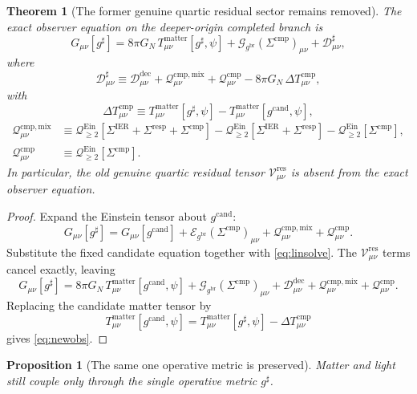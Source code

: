 \documentclass[11pt]{article}
\newcommand{\ObserverMetric}{g^{\mathrm{br}}}
\newcommand{\CandidateMetric}{g^{\mathrm{cand}}}
\newcommand{\CompletedMetric}{g^{\sharp}}
\newcommand{\BaseShift}{\Sigma^{\mathrm{IER}}}
\newcommand{\ResponseShift}{\Sigma^{\mathrm{resp}}}
\newcommand{\CompShift}{\Sigma^{\mathrm{cmp}}}
\newcommand{\ResidualCore}{\mathcal V_{\mu\nu}^{\mathrm{res}}}
\newcommand{\ResidualDec}{\mathcal D_{\mu\nu}^{\mathrm{dec}}}
\newcommand{\GaugeBook}{\mathcal G_{\ObserverMetric}}
\newcommand{\EinLin}{\mathcal E_{\ObserverMetric}}
\newcommand{\EinQuad}{\mathcal Q_{\ge 2}^{\mathrm{Ein}}}
\newcommand{\CompMix}{\mathcal Q_{\mu\nu}^{\mathrm{cmp,mix}}}
\newcommand{\CompQuad}{\mathcal Q_{\mu\nu}^{\mathrm{cmp}}}
\newcommand{\CompDec}{\mathcal D_{\mu\nu}^{\sharp}}
\newcommand{\DeltaTComp}{\Delta T_{\mu\nu}^{\mathrm{cmp}}}
\newtheorem{proposition}{Proposition}
\newtheorem{theorem}{Theorem}
\begin{document}
\begin{theorem}[The former genuine quartic residual sector remains removed]
\label{thm:removed}
The exact observer equation on the deeper-origin completed branch is
\begin{equation}
G_{\mu\nu}[\CompletedMetric]
=
8\pi G_N\,T_{\mu\nu}^{\mathrm{matter}}[\CompletedMetric,\psi]
+\GaugeBook(\CompShift)_{\mu\nu}
+\CompDec,
\label{eq:newobs}
\end{equation}
where
\begin{equation}
\CompDec
\equiv
\ResidualDec+\CompMix+\CompQuad-8\pi G_N\,\DeltaTComp,
\label{eq:compdec}
\end{equation}
with
\begin{equation}
\DeltaTComp
\equiv
T_{\mu\nu}^{\mathrm{matter}}[\CompletedMetric,\psi]
-T_{\mu\nu}^{\mathrm{matter}}[\CandidateMetric,\psi],
\label{eq:deltat}
\end{equation}
\begin{align}
\CompMix
&\equiv
\EinQuad[\BaseShift+\ResponseShift+\CompShift]
-\EinQuad[\BaseShift+\ResponseShift]
-\EinQuad[\CompShift],
\label{eq:compmix}
\\
\CompQuad
&\equiv
\EinQuad[\CompShift].
\label{eq:compquad}
\end{align}
In particular, the old genuine quartic residual tensor \(\ResidualCore\) is absent from the exact observer equation.
\end{theorem}

\begin{proof}
Expand the Einstein tensor about \(\CandidateMetric\):
\[
G_{\mu\nu}[\CompletedMetric]
=
G_{\mu\nu}[\CandidateMetric]
+\EinLin(\CompShift)_{\mu\nu}
+\CompMix+\CompQuad.
\]
Substitute the fixed candidate equation together with \eqref{eq:linsolve}. The \(\ResidualCore\) terms cancel exactly, leaving
\[
G_{\mu\nu}[\CompletedMetric]
=
8\pi G_N\,T_{\mu\nu}^{\mathrm{matter}}[\CandidateMetric,\psi]
+\GaugeBook(\CompShift)_{\mu\nu}
+\ResidualDec+\CompMix+\CompQuad.
\]
Replacing the candidate matter tensor by
\[
T_{\mu\nu}^{\mathrm{matter}}[\CandidateMetric,\psi]
=
T_{\mu\nu}^{\mathrm{matter}}[\CompletedMetric,\psi]-\DeltaTComp
\]
gives \eqref{eq:newobs}.
\end{proof}

\begin{proposition}[The same one operative metric is preserved]
\label{prop:onemetric}
Matter and light still couple only through the single operative metric \(\CompletedMetric\).
\end{proposition}
\end{document}
